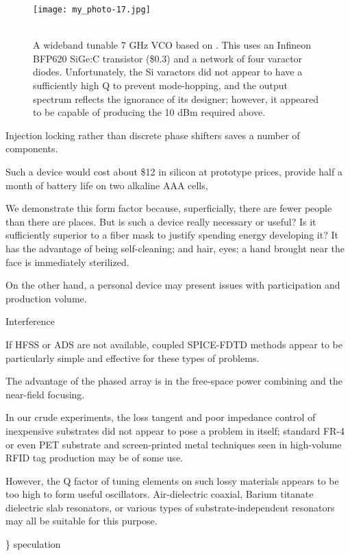 \documentclass[paper.tex]{subfiles}
\begin{document}
\begin{figure}[H]
	\captionsetup{singlelinecheck = false, justification=justified}
	\centering
	\texttt{[image: my\_photo-17.jpg]}
	\caption{\\ A wideband tunable 7 GHz VCO based on \cite{TripleTuned2008}. This uses an Infineon BFP620 SiGe:C transistor (\$0.3) and a network of four varactor diodes. Unfortunately, the Si varactors did not appear to have a sufficiently high Q to prevent mode-hopping, and the output spectrum reflects the ignorance of its designer; however, it appeared to be capable of producing the 10 dBm required above.}
\end{figure}





Injection locking rather than discrete phase shifters saves a number of components.

Such a device would cost about \$12 in silicon at prototype prices, provide half a month of battery life on two alkaline AAA cells, 

We demonstrate this form factor because, superficially, there are fewer people than there are places. But is such a device really necessary or useful? Is it sufficiently superior to a fiber mask to justify spending energy developing it? It has the advantage of being self-cleaning; and hair, eyes; a hand brought near the face is immediately sterilized.


On the other hand, a personal device may present issues with participation and production volume. 

Interference

If HFSS or ADS are not available, coupled SPICE-FDTD methods appear to be particularly simple and effective for these types of problems.

The advantage of the phased array is in the free-space power combining and the near-field focusing.

In our crude experiments, the loss tangent and poor impedance control of inexpensive substrates did not appear to pose a problem in itself; standard FR-4 or even PET substrate and screen-printed metal techniques seen in high-volume RFID tag production may be of some use. 

However, the Q factor of tuning elements on such lossy materials appears to be too high to form useful oscillators. Air-dielectric coaxial, Barium titanate dielectric slab resonators, or various types of substrate-independent resonators may all be suitable for this purpose.

{\color{red} \} speculation } 
\end{document}
